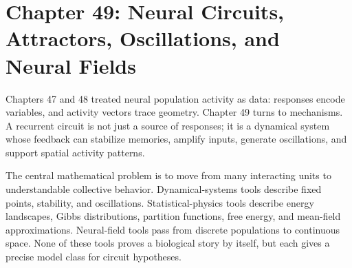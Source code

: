 \section{Chapter 49: Neural Circuits, Attractors, Oscillations, and Neural Fields}
\label{ch:neural-circuits-attractors-oscillations-neural-fields}

Chapters 47 and 48 treated neural population activity as data: responses encode variables, and activity vectors trace geometry. Chapter 49 turns to mechanisms. A recurrent circuit is not just a source of responses; it is a dynamical system whose feedback can stabilize memories, amplify inputs, generate oscillations, and support spatial activity patterns.

The central mathematical problem is to move from many interacting units to understandable collective behavior. Dynamical-systems tools describe fixed points, stability, and oscillations. Statistical-physics tools describe energy landscapes, Gibbs distributions, partition functions, free energy, and mean-field approximations. Neural-field tools pass from discrete populations to continuous space. None of these tools proves a biological story by itself, but each gives a precise model class for circuit hypotheses.


